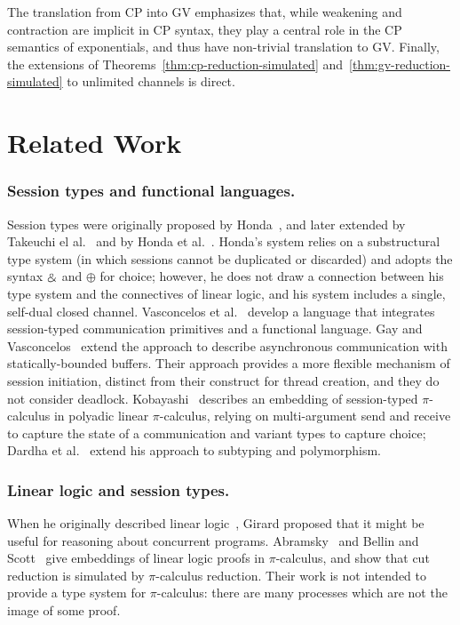 \documentclass[oribibl,orivec,envcountsame]{llncs}
\begin{document}
The translation from CP into GV emphasizes that, while weakening and contraction are implicit in CP
syntax, they play a central role in the CP semantics of exponentials, and thus have non-trivial
translation to GV.  Finally, the extensions of Theorems~\ref{thm:cp-reduction-simulated}
and~\ref{thm:gv-reduction-simulated} to unlimited channels is direct.


\section{Related Work}\label{sec:related}


\subsubsection{Session types and functional languages.}

Session types were originally proposed by Honda~\cite{Honda93}, and later extended by Takeuchi el
al.~\cite{Takeuchi94} and by Honda et al.~\cite{Honda98}.  Honda's system relies on a substructural
type system (in which sessions cannot be duplicated or discarded) and adopts the syntax $\mathbin\binampersand$ and
$\oplus$ for choice; however, he does not draw a connection between his type system and the
connectives of linear logic, and his system includes a single, self-dual closed channel.
Vasconcelos et al.~\cite{VasconcelosGR06} develop a language that integrates session-typed
communication primitives and a functional language.  Gay and Vasconcelos~\cite{GayVasconcelos10}
extend the approach to describe asynchronous communication with statically-bounded buffers.  Their
approach provides a more flexible mechanism of session initiation, distinct from their construct for
thread creation, and they do not consider deadlock.  Kobayashi~\cite{Kobayashi02} describes an
embedding of session-typed $\pi$-calculus in polyadic linear $\pi$-calculus, relying on
multi-argument send and receive to capture the state of a communication and variant types to capture
choice; Dardha et al.~\cite{Dardha12} extend his approach to subtyping and polymorphism.

\subsubsection{Linear logic and session types.}

When he originally described linear logic~\cite{Girard87}, Girard proposed that it might be useful
for reasoning about concurrent programs.  Abramsky~\cite{Abramsky92} and Bellin and
Scott~\cite{BellinScott94} give embeddings of linear logic proofs in $\pi$-calculus, and show that
cut reduction is simulated by $\pi$-calculus reduction.  Their work is not intended to provide a
type system for $\pi$-calculus: there are many processes which are not the image of some proof.
\end{document}
